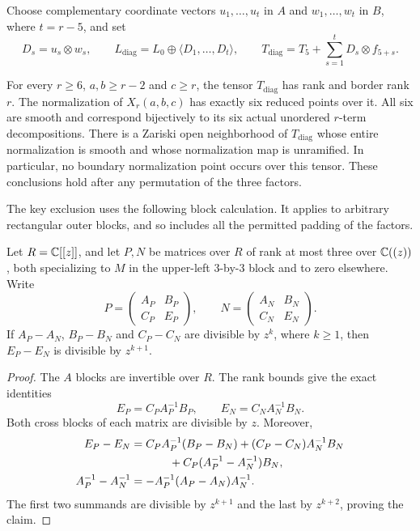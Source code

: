 Choose complementary coordinate vectors $u_1,\ldots,u_t$ in $A$
and $w_1,\ldots,w_t$ in $B$, where $t=r-5$, and set
\begin{equation}\label{nf:diagonal-data}
 D_s=u_s\otimes w_s,\qquad
 L_{\mathrm{diag}}=L_0\oplus\langle D_1,\ldots,D_t\rangle,
 \qquad
 T_{\mathrm{diag}}=T_5+\sum_{s=1}^tD_s\otimes f_{5+s}.
\end{equation}

\begin{theorem}
\label{nf:diagonal}
For every $r\geq6$, $a,b\geq r-2$ and $c\geq r$, the tensor
$T_{\mathrm{diag}}$ has rank and border rank $r$. The normalization
of $X_r(a,b,c)$ has exactly six reduced points over it. All six are
smooth and correspond bijectively to its six actual unordered
$r$-term decompositions. There is a Zariski open neighborhood of
$T_{\mathrm{diag}}$ whose entire normalization is smooth and whose
normalization map is unramified. In particular, no boundary
normalization point occurs over this tensor. These conclusions hold
after any permutation of the three factors.
\end{theorem}

The key exclusion uses the following block calculation. It applies to
arbitrary rectangular outer blocks, and so includes all the permitted
padding of the factors.

\begin{lemma}
\label{nf:diagonal-block}
Let $R=\mathbb C[[z]]$, and let $P,N$ be matrices over $R$ of rank at most
three over $\mathbb C((z))$, both specializing to $M$ in the upper-left
$3$-by-$3$ block and to zero elsewhere. Write
\[
 P=\begin{pmatrix}A_P&B_P\\ C_P&E_P\end{pmatrix},
 \qquad
 N=\begin{pmatrix}A_N&B_N\\ C_N&E_N\end{pmatrix}.
\]
If $A_P-A_N$, $B_P-B_N$ and $C_P-C_N$ are divisible by $z^k$,
where $k\geq1$, then $E_P-E_N$ is divisible by $z^{k+1}$.
\end{lemma}

\begin{proof}
The $A$ blocks are invertible over $R$. The rank bounds give the
exact identities
\[
 E_P=C_PA_P^{-1}B_P,\qquad E_N=C_NA_N^{-1}B_N.
\]
Both cross blocks of each matrix are divisible by $z$. Moreover,
\begin{align*}
 E_P-E_N
 &=C_PA_P^{-1}(B_P-B_N)
   +(C_P-C_N)A_N^{-1}B_N\\
 &\hspace{12mm}+C_P(A_P^{-1}-A_N^{-1})B_N,\\
 A_P^{-1}-A_N^{-1}
 &=-A_P^{-1}(A_P-A_N)A_N^{-1}.
\end{align*}
The first two summands are divisible by $z^{k+1}$ and the last by
$z^{k+2}$, proving the claim.
\end{proof}

